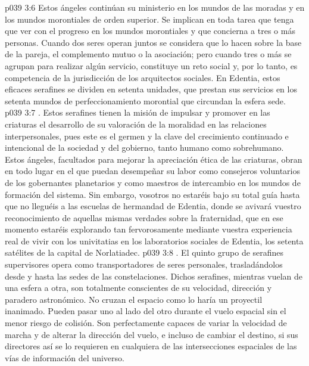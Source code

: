 \vs p039 3:6 Estos ángeles continúan su ministerio en los mundos de las moradas y en los mundos morontiales de orden superior. Se implican en toda tarea que tenga que ver con el progreso en los mundos morontiales y que concierna a tres o más personas. Cuando dos seres operan juntos se considera que lo hacen sobre la base de la pareja, el complemento mutuo o la asociación; pero cuando tres o más se agrupan para realizar algún servicio, constituye un reto social y, por lo tanto, es competencia de la jurisdicción de los arquitectos sociales. En Edentia, estos eficaces serafines se dividen en setenta unidades, que prestan sus servicios en los setenta mundos de perfeccionamiento morontial que circundan la esfera sede.
\vs p039 3:7 . Estos serafines tienen la misión de impulsar y promover en las criaturas el desarrollo de su valoración de la moralidad en las relaciones interpersonales, pues este es el germen y la clave del crecimiento continuado e intencional de la sociedad y del gobierno, tanto humano como sobrehumano. Estos ángeles, facultados para mejorar la apreciación ética de las criaturas, obran en todo lugar en el que puedan desempeñar su labor como consejeros voluntarios de los gobernantes planetarios y como maestros de intercambio en los mundos de formación del sistema. Sin embargo, vosotros no estaréis bajo su total guía hasta que no lleguéis a las escuelas de hermandad de Edentia, donde se avivará vuestro reconocimiento de aquellas mismas verdades sobre la fraternidad, que en ese momento estaréis explorando tan fervorosamente mediante vuestra experiencia real de vivir con los univitatias en los laboratorios sociales de Edentia, los setenta satélites de la capital de Norlatiadec.
\vs p039 3:8 . El quinto grupo de serafines supervisores opera como transportadores de seres personales, trasladándolos desde y hasta las sedes de las constelaciones. Dichos serafines, mientras vuelan de una esfera a otra, son totalmente conscientes de su velocidad, dirección y paradero astronómico. No cruzan el espacio como lo haría un proyectil inanimado. Pueden pasar uno al lado del otro durante el vuelo espacial sin el menor riesgo de colisión. Son perfectamente capaces de variar la velocidad de marcha y de alterar la dirección del vuelo, e incluso de cambiar el destino, si sus directores así se lo requieren en cualquiera de las intersecciones espaciales de las vías de información del universo.
